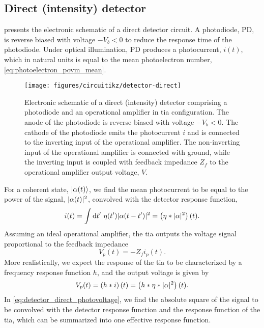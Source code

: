 \FloatBarrier
\subsection{Direct (intensity) detector}

 presents the electronic schematic of a direct detector circuit.
A photodiode, PD, is reverse biased with voltage $-V_b<0$ to reduce the response time of the photodiode.
Under optical illumination, PD produces a photocurrent, $i(t)$, which in natural units is equal to the mean photoelectron number, \cref{eq:photoelectron_povm_mean}.
\begin{figure}[htb]
    \centering
    \texttt{[image: figures/circuitikz/detector-direct]}
    \caption{Electronic schematic of a direct (intensity) detector comprising a photodiode and an operational amplifier in \gls{tia} configuration. The anode of the photodiode is reverse biased with voltage $-V_b<0$. The cathode of the photodiode emits the photocurrent $i$ and is connected to the inverting input of the operational amplifier. The non-inverting input of the operational amplifier is connected with ground, while the inverting input is coupled with feedback impedance $Z_f$ to the operational amplifier output voltage, $V$.}\label{fig:detector_direct}
\end{figure}
For a coherent state, $\lvert\alpha(t)\rangle$, we find the mean photocurrent to be equal to the power of the signal, $\lvert\alpha(t)\rvert^2$, convolved with the detector response function,
\begin{equation}
	i(t)
	=
	\int\dd{t^\prime}
	\eta(t^\prime)
	\abs{\alpha(t-t^\prime)}^2
	=
	\left(\eta\conv\abs{\alpha}^2\right)(t)
	\label{eq:detector_direct_photocurrent}
	.
\end{equation}
Assuming an ideal operational amplifier, the \gls{tia} outputs the voltage signal proportional to the feedback impedance
\begin{equation}
	V_p(t)
	=
	-
	Z_f
	i_p(t)
	.
\end{equation}
More realistically, we expect the response of the \gls{tia} to be characterized by a frequency response function $h$, and the output voltage is given by
\begin{equation}
	V_p(t)
	=
	\left(h\ast i\right)(t)
	=
	\left(h\ast\eta\ast\lvert\alpha\rvert^2\right)(t)
	\label{eq:detector_direct_photovoltage}
	.
\end{equation}
In \cref{eq:detector_direct_photovoltage}, we find the absolute square of the signal to be convolved with the detector response function and the response function of the \gls{tia}, which can be summarized into one effective response function.

